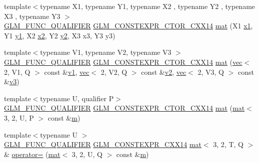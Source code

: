 \begin{DoxyCompactItemize}
{\footnotesize template$<$typename X1, typename Y1, typename X2 , typename Y2 , typename X3 , typename Y3 $>$ }\\\mbox{\hyperlink{setup_8hpp_a33fdea6f91c5f834105f7415e2a64407}{G\+L\+M\+\_\+\+F\+U\+N\+C\+\_\+\+Q\+U\+A\+L\+I\+F\+I\+ER}} \mbox{\hyperlink{setup_8hpp_a0900f9145e68bf6061b6f5e7be3fa751}{G\+L\+M\+\_\+\+C\+O\+N\+S\+T\+E\+X\+P\+R\+\_\+\+C\+T\+O\+R\+\_\+\+C\+X\+X14}} \mbox{\hyperlink{structglm_1_1mat_3_013_00_012_00_01_t_00_01_q_01_4_a83ed0230699667e599d391d6ccd411eb}{mat}} (X1 \mbox{\hyperlink{_s_d_l__opengl__glext_8h_a49825216c96caaeb09237b36651181c5}{x1}}, Y1 \mbox{\hyperlink{_s_d_l__opengl__glext_8h_a3af6c78fcdfccea028a5878bc747ef39}{y1}}, X2 \mbox{\hyperlink{_s_d_l__opengl__glext_8h_a7b907a03236685c534d89d604cff23c8}{x2}}, Y2 \mbox{\hyperlink{_s_d_l__opengl__glext_8h_a2be1135ed68e8d80fa9e130c7814f8c2}{y2}}, X3 x3, Y3 y3)
\item 
{\footnotesize template$<$typename V1, typename V2, typename V3 $>$ }\\\mbox{\hyperlink{setup_8hpp_a33fdea6f91c5f834105f7415e2a64407}{G\+L\+M\+\_\+\+F\+U\+N\+C\+\_\+\+Q\+U\+A\+L\+I\+F\+I\+ER}} \mbox{\hyperlink{setup_8hpp_a0900f9145e68bf6061b6f5e7be3fa751}{G\+L\+M\+\_\+\+C\+O\+N\+S\+T\+E\+X\+P\+R\+\_\+\+C\+T\+O\+R\+\_\+\+C\+X\+X14}} \mbox{\hyperlink{structglm_1_1mat_3_013_00_012_00_01_t_00_01_q_01_4_afe887fa3ecb498d777f704ccfbf90946}{mat}} (\mbox{\hyperlink{structglm_1_1vec}{vec}}$<$ 2, V1, Q $>$ const \&\mbox{\hyperlink{_s_d_l__opengl__glext_8h_a435c176a02c061b43e19bdf7c86cceae}{v1}}, \mbox{\hyperlink{structglm_1_1vec}{vec}}$<$ 2, V2, Q $>$ const \&\mbox{\hyperlink{_s_d_l__opengl__glext_8h_a0928f6d0f0f794ba000a21dfae422136}{v2}}, \mbox{\hyperlink{structglm_1_1vec}{vec}}$<$ 2, V3, Q $>$ const \&\mbox{\hyperlink{_s_d_l__opengl__glext_8h_acc806b31cbf466ceba6555983d8b814d}{v3}})
\item 
{\footnotesize template$<$typename U, qualifier P$>$ }\\\mbox{\hyperlink{setup_8hpp_a33fdea6f91c5f834105f7415e2a64407}{G\+L\+M\+\_\+\+F\+U\+N\+C\+\_\+\+Q\+U\+A\+L\+I\+F\+I\+ER}} \mbox{\hyperlink{setup_8hpp_a0900f9145e68bf6061b6f5e7be3fa751}{G\+L\+M\+\_\+\+C\+O\+N\+S\+T\+E\+X\+P\+R\+\_\+\+C\+T\+O\+R\+\_\+\+C\+X\+X14}} \mbox{\hyperlink{structglm_1_1mat_3_013_00_012_00_01_t_00_01_q_01_4_a35a259f91ad5cca9bab10166d9df9d94}{mat}} (\mbox{\hyperlink{structglm_1_1mat}{mat}}$<$ 3, 2, U, P $>$ const \&\mbox{\hyperlink{_s_d_l__opengl__glext_8h_af593500c283bf1a787a6f947f503a5c2}{m}})
\item 
{\footnotesize template$<$typename U $>$ }\\\mbox{\hyperlink{setup_8hpp_a33fdea6f91c5f834105f7415e2a64407}{G\+L\+M\+\_\+\+F\+U\+N\+C\+\_\+\+Q\+U\+A\+L\+I\+F\+I\+ER}} \mbox{\hyperlink{setup_8hpp_a4dd12abf5e1164bc57f3a34671d03844}{G\+L\+M\+\_\+\+C\+O\+N\+S\+T\+E\+X\+P\+R\+\_\+\+C\+X\+X14}} \mbox{\hyperlink{structglm_1_1mat}{mat}}$<$ 3, 2, T, Q $>$ \& \mbox{\hyperlink{structglm_1_1mat_3_013_00_012_00_01_t_00_01_q_01_4_a5665b9b94c9f67c56cc7d9f6ac569ef2}{operator=}} (\mbox{\hyperlink{structglm_1_1mat}{mat}}$<$ 3, 2, U, Q $>$ const \&\mbox{\hyperlink{_s_d_l__opengl__glext_8h_af593500c283bf1a787a6f947f503a5c2}{m}})

\end{DoxyCompactItemize}

